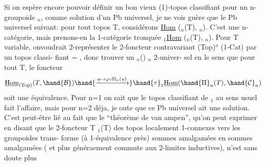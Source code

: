 Si on espère encore pouvoir définir un bon vieux (1)-topos classifiant
pour un n-groupoide $_n$, comme solution d'un Pb universel, je ne vois
guère que le Pb universel suivant: pour tout topos T, considérons
\underline{Hom} (\hand{$\Pi$}$_n$(T), $_n$). C'est une n-catégorie, mais prenons-en la 1-catégorie
tronquée \hand{$\tau$}$_1$\underline{Hom} (\hand{$\Pi$}$_n$(T), $_n$). Pour T variable, on\hand{/}voudrait 2-représenter
le 2-foncteur contravariant (Top)$^{o}$ \hand{$\longrightarrow$} (1-Cat) par un topos classi-%
fiant  =  , donc trouver un \hand{$\Pi$}$_n$() \hand{$\xrightarrow{\varphi}$} $_n$ 2-univer-%
sel en le sens que pour tout T, le foncteur
\[ \underline{\mathrm{Hom}}_{(\mathrm{Top})}(T , \hand{\mathcal{B}} ) \hand{\xrightarrow{u \mapsto \varphi \circ \Pi_n(u)}} \hand{\tau}_1\underline{\mathrm{Hom}} (\hand{\Pi}_n(T), \hand{\mathcal{C}}_n) \]
soit une équivalence. Pour n=1 on sait que le topos classifiant de $_1$
au sens usuel fait l'affaire, mais pour n=2 déja, je oute que ce Pb
universel ait une solution. C'est peut-être lié au fait que le
``théorème de van ampen'', qu'on peut exprimer en disant que le 2-foncteur
T \hand{$\longrightarrow\Pi$}$_1$(T) des topos localement 1-connexes vers les groupoides trans-%
forme (à 1-équivalence près) sommes amalgamées en sommes amalgamées ( et
plus généraement commute aux 2-limites inductives), n'est sans doute plus

